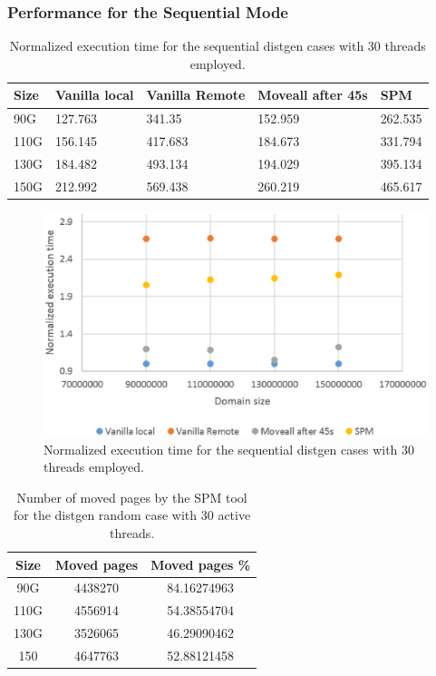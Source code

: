 \subsubsection{Performance for the Sequential Mode}\label{subsection:time-dgenat-seq.eps}

\begin{table}[th]
	\centering
		\begin{tabularx}{\textwidth}{|l|l|l|l|X|}
		\hline
			Size & Vanilla local & Vanilla Remote & Moveall after 45s & SPM \\
			\hline
			90G & 127.763 & 341.35 & 152.959 & 262.535\\
			\hline
			110G & 156.145 & 417.683 & 184.673 & 331.794\\
			\hline
			130G & 184.482 & 493.134 & 194.029 & 395.134\\
			\hline
			150G & 212.992 & 569.438 & 260.219 & 465.617\\
			\hline
		\end{tabularx}
		\caption{Normalized execution time for the sequential distgen cases with 30 threads employed.}
		\label{table:res-dgentimserat}
\end{table}

\begin{figure}[th]
	\centering
		\includegraphics[width=.8\textwidth]{figures/time-dgenatt-ser.eps}
		\caption{Normalized execution time for the sequential distgen cases with 30 threads employed.}
		\label{fig:time-dgenatt-ser}
\end{figure}

\begin{table}[th]
	\centering
		\begin{tabularx}{.6\textwidth}{|c|c|c|}
		\hline
			Size & Moved pages & Moved pages \%  \\
			\hline
			90G & 4438270 & 84.16274963 \\
			\hline
			110G & 4556914 & 54.38554704 \\
			\hline
			130G & 3526065 & 46.29090462 \\
			\hline
			150 & 4647763 & 52.88121458 \\
			\hline
		\end{tabularx}
		\caption{Number of moved pages by the SPM tool for the distgen random case with 30 active threads.}
		\label{table:res-tbl-dgenmvdrdmat}
\end{table}


